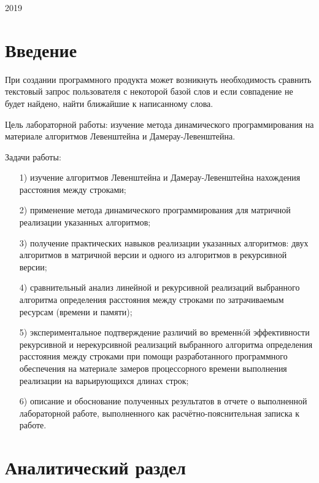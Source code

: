 \documentclass[a4paper,12pt]{article}
\begin{document}
\vspace*{40mm}
\begin{center}
2019    
\end{center}

\thispagestyle{empty}
\pagebreak

\tableofcontents
\pagebreak


\section*{Введение}

При создании программного продукта может возникнуть необходимость сравнить текстовый запрос пользователя с некоторой базой слов и если совпадение не будет найдено, найти ближайшие к написанному слова. 

Цель лабораторной работы: изучение метода динамического программирования на материале алгоритмов
Левенштейна и Дамерау-Левенштейна.

Задачи работы:

\begin{enumerate} 
	\item[1)] изучение алгоритмов Левенштейна и Дамерау-Левенштейна нахождения 
	расстояния между
	строками;
	\item[2)] применение метода динамического программирования для матричной 
	реализации указанных
	алгоритмов;
	\item[3)] получение практических навыков реализации указанных алгоритмов: двух
	алгоритмов в
	матричной версии и одного из алгоритмов в рекурсивной версии;
	\item[4)] сравнительный анализ линейной и рекурсивной реализаций выбранного
	алгоритма
	определения расстояния между строками по затрачиваемым ресурсам (времени и
	памяти);
	\item[5)] экспериментальное подтверждение различий во временнóй эффективности
	рекурсивной и
	нерекурсивной реализаций выбранного алгоритма определения расстояния между
	строками при
	помощи разработанного программного обеспечения на материале замеров
	процессорного времени
	выполнения реализации на варьирующихся длинах строк;
	\item[6)] описание и обоснование полученных результатов в отчете о выполненной
	лабораторной
	работе, выполненного как расчётно-пояснительная записка к работе. 
\end{enumerate} 
\pagebreak



\section{Аналитический раздел}
	
\end{document}
